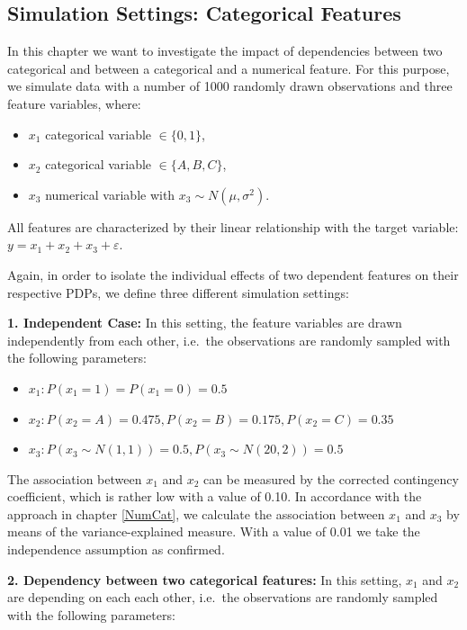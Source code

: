 \documentclass[]{krantz}
\providecommand{\tightlist}{%
  \setlength{\itemsep}{0pt}\setlength{\parskip}{0pt}}
\begin{document}
\subsection{Simulation Settings: Categorical
Features}\label{simulation-settings-categorical-features}

In this chapter we want to investigate the impact of dependencies
between two categorical and between a categorical and a numerical
feature. For this purpose, we simulate data with a number of 1000
randomly drawn observations and three feature variables, where:

\begin{itemize}
\tightlist
\item
  \(x_1\) categorical variable \(\in \{0,1\}\),
\item
  \(x_2\) categorical variable \(\in \{A,B,C\}\),
\item
  \(x_3\) numerical variable with \(x_3 \sim N(\mu, \sigma^2)\).
\end{itemize}

All features are characterized by their linear relationship with the
target variable: \(y=x_1+x_2+x_3+\varepsilon\).

Again, in order to isolate the individual effects of two dependent
features on their respective PDPs, we define three different simulation
settings:

\textbf{1. Independent Case:} In this setting, the feature variables are
drawn independently from each other, i.e.~the observations are randomly
sampled with the following parameters:

\begin{itemize}
\tightlist
\item
  \(x_1: P(x_1=1)=P(x_1=0)=0.5\)
\item
  \(x_2: P(x_2=A)=0.475, P(x_2=B)=0.175, P(x_2=C)=0.35\)
\item
  \(x_3: P(x_3 \sim N(1,1))=0.5, P(x_3 \sim N(20,2))=0.5\)
\end{itemize}

The association between \(x_1\) and \(x_2\) can be measured by the
corrected contingency coefficient, which is rather low with a value of
0.10. In accordance with the approach in chapter \ref{NumCat}, we
calculate the association between \(x_1\) and \(x_3\) by means of the
variance-explained measure. With a value of 0.01 we take the
independence assumption as confirmed.

\textbf{2. Dependency between two categorical features:} In this
setting, \(x_1\) and \(x_2\) are depending on each each other, i.e.~the
observations are randomly sampled with the following parameters:
\end{document}
